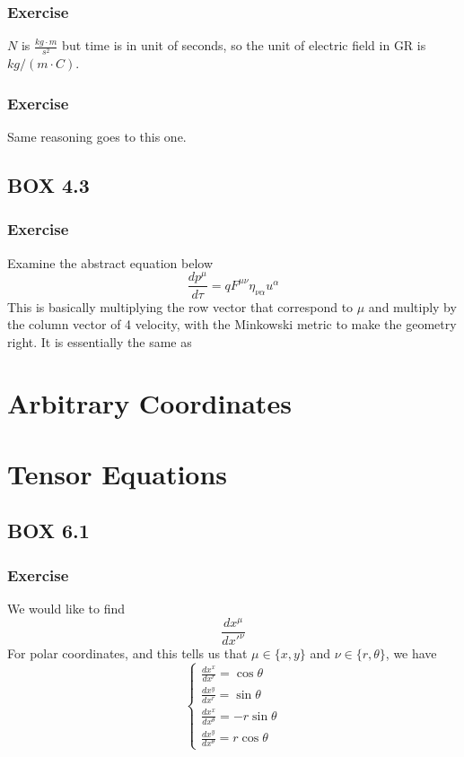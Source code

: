 \documentclass[12pt]{memoir}
\newcommand{\dydx}[2]{\frac{d #1}{d #2}}
\begin{document}
\subsection{Exercise}
$N$ is $\frac{kg\cdot m}{s^2}$ but time is in unit of seconds, so the unit of electric field in GR is $kg/(m\cdot C)$.

\subsection{Exercise}
Same reasoning goes to this one.

\section{BOX 4.3}
\subsection{Exercise}
Examine the abstract equation below
\[
\dydx{p^{\mu}}{\tau} = qF^{\mu\nu}\eta_{\nu\alpha}u^{\alpha}
\]
This is basically multiplying the row vector that correspond to $\mu$ and multiply by the column vector of 4 velocity, with the Minkowski metric to make the geometry right. It is essentially the same as

\begingroup
\let\clearpage\relax
\chapter{Arbitrary Coordinates}
\endgroup 



\begingroup
\let\clearpage\relax
\chapter{Tensor Equations}
\endgroup 

\section{BOX 6.1}
    \subsection{Exercise}

    We would like to find 
    \[
    \dydx{x^\mu}{x'^\nu}
    \]
    For polar coordinates, and this tells us that $\mu \in \{ x,y\}$ and $\nu \in \{r,\theta\}$, we have
    \[
    \begin{cases}
        \dydx{x^x}{x^r} = \cos\theta\\
        \dydx{x^y}{x^r} = \sin\theta\\
        \dydx{x^x}{x^\theta} = -r\sin\theta\\
        \dydx{x^y}{x^\theta} = r\cos\theta
    \end{cases}
    \]
\end{document}
